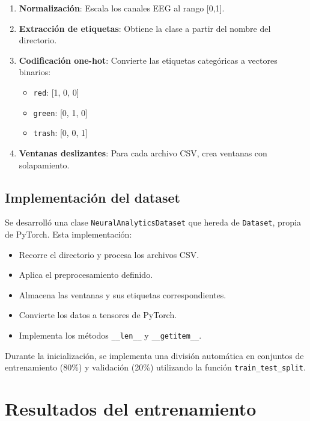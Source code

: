 \begin{enumerate}
    \item \textbf{Normalización}: Escala los canales EEG al rango [0,1].
    
    \item \textbf{Extracción de etiquetas}: Obtiene la clase a partir del nombre del directorio.
    
    \item \textbf{Codificación one-hot}: Convierte las etiquetas categóricas a vectores binarios:
    \begin{itemize}
        \item \texttt{red}: [1, 0, 0]
        \item \texttt{green}: [0, 1, 0]
        \item \texttt{trash}: [0, 0, 1]
    \end{itemize}
    
    \item \textbf{Ventanas deslizantes}: Para cada archivo CSV, crea ventanas con solapamiento.
\end{enumerate}

\subsection{Implementación del dataset}

Se desarrolló una clase \texttt{NeuralAnalyticsDataset} que hereda de \texttt{Dataset}, propia de PyTorch. Esta implementación:

\begin{itemize}
    \item Recorre el directorio y procesa los archivos CSV.
    \item Aplica el preprocesamiento definido.
    \item Almacena las ventanas y sus etiquetas correspondientes.
    \item Convierte los datos a tensores de PyTorch.
    \item Implementa los métodos \texttt{\_\_len\_\_} y \texttt{\_\_getitem\_\_}.
\end{itemize}

Durante la inicialización, se implementa una división automática en conjuntos de entrenamiento (80\%) y validación (20\%) utilizando la función \texttt{train\_test\_split}.

\section{Resultados del entrenamiento}

